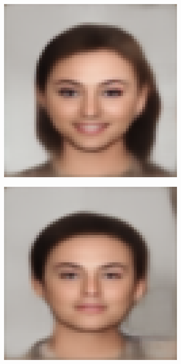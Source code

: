 \documentclass{IEEEcsmag}
\begin{document}
\begin{figure}[ht]
\begin{subfigure}{0.12\textwidth}
    \end{subfigure}
    \begin{subfigure}{0.12\textwidth}
        \includegraphics[width=\linewidth]{CUHK_Student/generated_images/f1-008-01-sz1.jpg_AE.png}
    \end{subfigure}
    \begin{subfigure}{0.12\textwidth}
        \includegraphics[width=\linewidth]{CUHK_Student/generated_images/M2-018-01-sz1.jpg_AE.png}
    \end{subfigure}


\end{figure}
\end{document}
